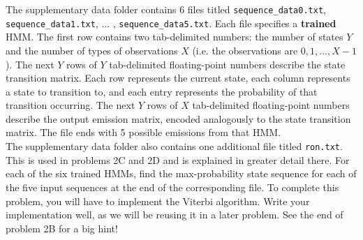 \documentclass{article}
\begin{document}
The supplementary data folder contains 6 files titled \texttt{sequence_data0.txt}, \texttt{sequence_data1.txt}, ... , \texttt{sequence_data5.txt}. Each file specifies a \textbf{trained} HMM. The first row contains two tab-delimited numbers: the number of states $Y$ and the number of types of observations $X$ (i.e. the observations are $0, 1, . . . , X - 1$). The next $Y$ rows of $Y$ tab-delimited floating-point numbers describe the state transition matrix. Each row represents the current state, each column represents a state to transition to, and each entry represents the probability of that transition occurring. The next $Y$ rows of $X$ tab-delimited floating-point numbers describe the output emission matrix, encoded analogously to the state transition matrix. The file ends with 5 possible emissions from that HMM. \\

The supplementary data folder also contains one additional file titled \texttt{ron.txt}. This is used in problems 2C and 2D and is explained in greater detail there. 
\indent\problem[10] %
For each of the six trained HMMs, find the max-probability state sequence for each of the five input sequences at the end of the corresponding file. To complete this problem, you will have to implement the Viterbi algorithm. Write your implementation well, as we will be reusing it in a later problem. See the end of problem 2B for a big hint!
\end{document}
